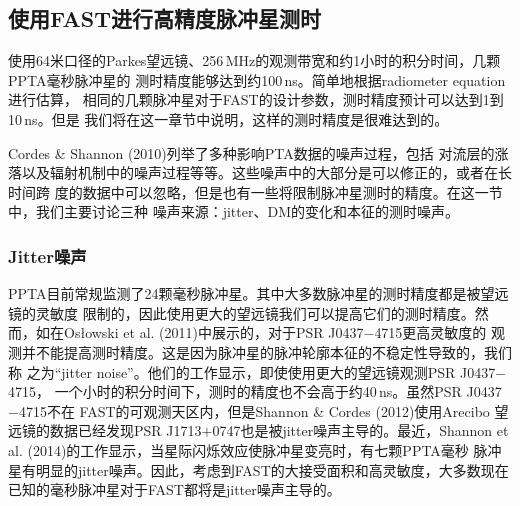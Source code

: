 \subsection{使用FAST进行高精度脉冲星测时}

使用64米口径的Parkes望远镜、256\,MHz的观测带宽和约1小时的积分时间，几颗PPTA毫秒脉冲星的
测时精度能够达到约100\,ns\supercite{Manchester13}。简单地根据radiometer equation进行估算，
相同的几颗脉冲星对于FAST的设计参数，测时精度预计可以达到1到10\,ns。但是
我们将在这一章节中说明，这样的测时精度是很难达到的。

Cordes \& Shannon (2010)\supercite{Cordes10}列举了多种影响PTA数据的噪声过程，包括
对流层的涨落以及辐射机制中的噪声过程等等。这些噪声中的大部分是可以修正的，或者在长时间跨
度的数据中可以忽略，但是也有一些将限制脉冲星测时的精度。在这一节中，我们主要讨论三种
噪声来源：jitter、DM的变化和本征的测时噪声。

\subsubsection{Jitter噪声}

PPTA目前常规监测了24颗毫秒脉冲星。其中大多数脉冲星的测时精度都是被望远镜的灵敏度
限制的，因此使用更大的望远镜我们可以提高它们的测时精度。然而，如在Os{\l}owski 
et al. (2011)\supercite{Oslowski11}中展示的，对于PSR J0437$-$4715更高灵敏度的
观测并不能提高测时精度。这是因为脉冲星的脉冲轮廓本征的不稳定性导致的，我们称
之为“jitter noise”。他们的工作显示，即使使用更大的望远镜观测PSR J0437$-$4715，
一个小时的积分时间下，测时的精度也不会高于约40\,ns。虽然PSR J0437$-$4715不在
FAST的可观测天区内，但是Shannon \& Cordes (2012)\supercite{Shannon12}使用Arecibo
望远镜的数据已经发现PSR J1713$+$0747也是被jitter噪声主导的。最近，Shannon et al. 
(2014)\supercite{Shannon14}的工作显示，当星际闪烁效应使脉冲星变亮时，有七颗PPTA毫秒
脉冲星有明显的jitter噪声。因此，考虑到FAST的大接受面积和高灵敏度，大多数现在
已知的毫秒脉冲星对于FAST都将是jitter噪声主导的。

